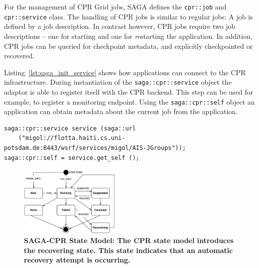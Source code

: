 \documentclass{rspublic}
\newcommand{\up}{}%
\newcommand{\upp}{}%
\begin{document}
For the management of CPR Grid jobs, SAGA defines the
\texttt{cpr::job} and \texttt{cpr::service} class.
The handling of CPR jobs is similar to regular jobs: A job is defined
by a job description. In contrast however, CPR jobs require
two job descriptions -- one for starting and one for
\textit{re}starting the application.
In addition, CPR jobs can be queried for
checkpoint metadata, and explicitly checkpointed or recovered.


Listing~\ref{lst:saga_init_service} shows how applications can connect
to the CPR infrastructure. During instantiation of the
\texttt{saga::cpr::service} object the adaptor is able to register
itself with the CPR backend. This step can be used for example, to
register a monitoring endpoint. Using the \texttt{saga::cpr::self}
object an application can obtain metadata about the current job from
the application.
\begin{lstlisting}[style=myListing, caption={\footnotesize \bf SAGA-CPR: Initialize Migol Session\newline\newline}, float=t, label={lst:saga_init_service}] 
saga::cpr::service service (saga::url 
    ("migol://flotta.haiti.cs.uni-potsdam.de:8443/wsrf/services/migol/AIS-JGroups"));
saga::cpr::self = service.get_self ();
\end{lstlisting}

\begin{figure}[h!]
    \centering
    \upp
        \includegraphics[width=0.43\textwidth]{cpr-statemodel.pdf}
    \caption{\footnotesize \bf SAGA-CPR State Model: The CPR state model introduces the recovering state. This state indicates that an automatic recovery attempt is  occurring.\up}
    \label{fig:cpr-statemodel}
\end{figure}
 
\end{document}
